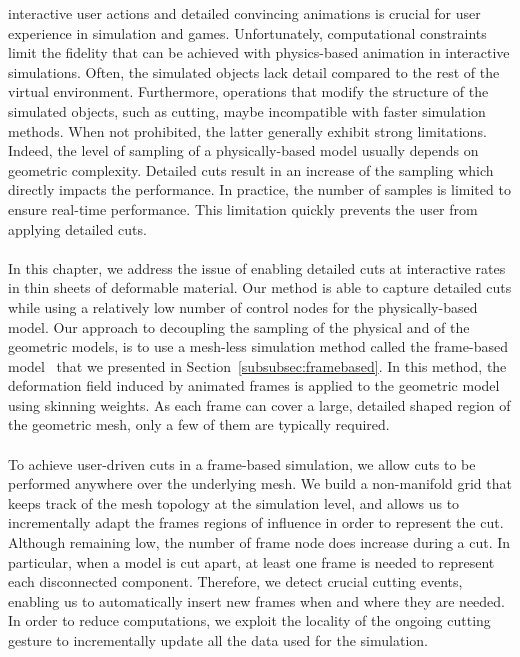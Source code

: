  interactive user actions and detailed convincing animations is crucial for user experience in simulation and games. Unfortunately, computational constraints limit the 
fidelity that can be achieved with physics-based animation
in interactive simulations. Often, the simulated objects lack detail compared to the rest of the virtual environment.
Furthermore, operations that modify the structure of the simulated objects, such as cutting, 
maybe incompatible with faster simulation methods.
When not prohibited, the latter generally exhibit strong limitations. Indeed, the level of sampling of a physically-based model usually depends on geometric complexity. Detailed cuts result in an increase of the sampling which directly impacts the performance. In practice, the number of samples is limited to ensure real-time performance. This limitation quickly prevents the user from applying detailed cuts.  
\\ \\
In this chapter, we address the issue of enabling detailed cuts at interactive rates in  thin sheets of deformable material.
 Our method is able to capture detailed cuts while using a relatively low number of control nodes for the physically-based model.
Our approach to decoupling the sampling of the physical and of the geometric models, is to use a mesh-less simulation method called the frame-based model~\cite{Gilles2011} that we presented in Section~\ref{subsubsec:framebased}. In this method, the deformation field induced by animated frames is applied to the geometric model using skinning weights. As each frame can cover a large, detailed shaped region of the geometric mesh, only a few of them are typically required.
\\ \\
To achieve user-driven cuts in a frame-based simulation, we allow cuts to be performed anywhere over the underlying mesh.
We build a non-manifold grid that keeps track of the mesh topology at the simulation level, and allows us to incrementally adapt the frames regions of influence in order to  represent the cut.
Although remaining low, the number of frame node does increase during a cut. 
In particular, when a model is cut apart, at least one frame is needed to represent each disconnected component. 
Therefore, we detect crucial cutting events, enabling us to automatically insert new frames when and where they are needed.
In order to reduce computations, we exploit the locality of the ongoing cutting gesture to incrementally update all the data used for the simulation.
